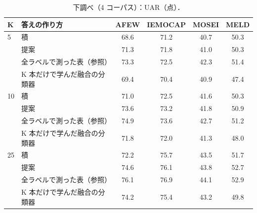 \begin{table}[H]\centering\small
\caption{下調べ（4 コーパス）：UAR（点）．}
\begin{tabular}{llcccc}
\toprule
K & 答えの作り方 & AFEW & IEMOCAP & MOSEI & MELD \\
\midrule
5 & 積 & 68.6 & 71.2 & 40.7 & 50.3 \\
 & 提案 & 71.3 & 71.8 & 41.0 & 50.3 \\
 & 全ラベルで測った表（参照） & 73.3 & 72.5 & 42.3 & 51.4 \\
 & K 本だけで学んだ融合の分類器 & 69.4 & 70.4 & 40.9 & 47.4 \\
\midrule
10 & 積 & 71.0 & 72.5 & 41.6 & 50.3 \\
 & 提案 & 73.6 & 73.2 & 41.8 & 50.9 \\
 & 全ラベルで測った表（参照） & 74.9 & 73.6 & 42.7 & 51.2 \\
 & K 本だけで学んだ融合の分類器 & 71.8 & 72.0 & 41.3 & 48.0 \\
\midrule
25 & 積 & 72.2 & 75.7 & 43.5 & 51.7 \\
 & 提案 & 74.6 & 76.1 & 43.8 & 52.7 \\
 & 全ラベルで測った表（参照） & 76.1 & 76.9 & 44.1 & 52.9 \\
 & K 本だけで学んだ融合の分類器 & 74.2 & 75.4 & 43.2 & 49.8 \\
\bottomrule
\end{tabular}
\end{table}
